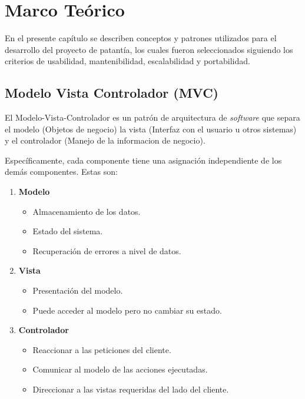 \chapter{Marco Teórico}

En el presente capítulo se describen conceptos y patrones utilizados para el desarrollo del proyecto de patantía, los cuales fueron seleccionados siguiendo los criterios de usabilidad, mantenibilidad, escalabilidad y portabilidad.

    \section{Modelo Vista Controlador (MVC)}
    
    El Modelo-Vista-Controlador es un patrón de arquitectura de \textit{software} que separa el modelo (Objetos de negocio) la vista (Interfaz con el usuario u otros sistemas) y el controlador (Manejo de la informacion de negocio)\cite{MVC-tiw}.
    
    Específicamente, cada componente tiene una asignación independiente de los demás componentes. Estas son:
    
    \begin{enumerate}
        \item \textbf{Modelo}
            \begin{itemize}
                \item Almacenamiento de los datos.
                \item Estado del sistema.
                \item Recuperación de errores a nivel de datos.
            \end{itemize}
        \item \textbf{Vista}
            \begin{itemize}
                \item Presentación del modelo.
                \item Puede acceder al modelo pero no cambiar su estado.
            \end{itemize}
        \item \textbf{Controlador}
            \begin{itemize}
                \item Reaccionar a las peticiones del cliente.
                \item Comunicar al modelo de las acciones ejecutadas.
                \item Direccionar a las vistas requeridas del lado del cliente.
            \end{itemize}
    \end{enumerate}
    
